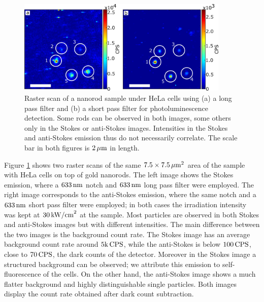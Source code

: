 \begin{figure}[htp] \centering
\includegraphics[width=0.9\textwidth]{Chapters/03_Background_Free/Figures/04_Stokes_AS/stokes_as_no_dye.png}
\caption{Raster scan of a nanorod sample under HeLa cells using (a) a long pass
filter and (b) a short pass filter for photoluminescence detection.
Some rods can be observed in both images, some others only in the Stokes or
anti-Stokes images. Intensities in the Stokes and anti-Stokes emission thus do
not necessarily correlate. The scale bar in both figures is $2\,\mu\textrm{m}$ in length.}
	\label{fig:stokes_as_no_dye}
\end{figure}

Figure \ref{fig:stokes_as_no_dye} shows two raster scans of the same
$7.5\times7.5\,\mu\textrm{m}^2$ area of the sample with HeLa cells on top of gold nanorods.
The left image shows the Stokes emission, where a $633\,\textrm{nm}$ notch and $633\,\textrm{nm}$
long pass filter were employed. The right image corresponds to the anti-Stokes
emission, where the same notch and a $633\,\textrm{nm}$ short pass filter were employed;
in both cases the irradiation intensity was kept at $30\,\textrm{kW/cm}^2$ at the
sample. Most particles are observed in both Stokes and anti-Stokes images but
with different intensities. The main difference between the two images is the
background count rate. The Stokes image has an average background count
rate around $5\textrm{k}\,\textrm{CPS}$, while the anti-Stokes is below $100\,\textrm{CPS}$,
close to $70\,\textrm{CPS}$, the dark counts of the detector. Moreover in the
Stokes image a structured background can be observed; we attribute this emission
to self-fluorescence of the cells. On the other hand, the anti-Stokes image
shows a much flatter background and highly distinguishable single particles.
Both images display the count rate obtained after dark count subtraction.

